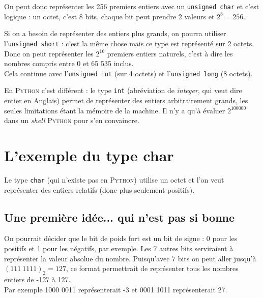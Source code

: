 On peut donc représenter les 256 premiers entiers avec un \texttt{unsigned char} et c'est logique : un octet, c'est 8 bits, chaque bit peut prendre 2
valeurs et $2^8=256$.

Si on a besoin de représenter des entiers plus grands, on pourra utiliser l'\texttt{unsigned short} : c'est la même chose mais ce type est représenté
sur 2 octets. Donc on peut représenter les $2^{16}$ premiers entiers naturels, c'est à dire les nombres compris entre 0 et 65 535 inclus.\\

Cela continue avec l'\texttt{unsigned int} (sur 4 octets) et l'\texttt{unsigned long} (8 octets).


\begin{remarque}[]
    En  \textsc{Python} c'est différent : le type \texttt{int} (abréviation de \textit{integer}, qui veut dire \og entier \fg{} en Anglais) permet de
    représenter des entiers arbitrairement grands, les seules limitations
    étant la mémoire de la machine. Il n'y a qu'à évaluer $2^{100000}$  dans un \textit{shell} \textsc{Python} pour s'en convaincre.
\end{remarque}



\section{L'exemple du type char}

Le type \texttt{char} (qui n'existe pas en \textsc{Python}) utilise un octet et l'on veut représenter des
entiers relatifs (donc plus seulement positifs).

\subsection{Une première idée... qui n'est pas si bonne}

On pourrait décider que le bit de poids fort est un bit de signe : 0 pour les positifs et 1 pour les négatifs, par
exemple. Les 7 autres bits serviraient à représenter la valeur absolue du nombre. Puisqu'avec 7 bits on peut aller
jusqu'à $(111\ 1111)_2=127$, ce format permettrait de représenter tous les nombres entiers de -127 à 127.\\

Par exemple 1000 0011 représenterait -3 et 0001 1011 représenterait 27.\\

